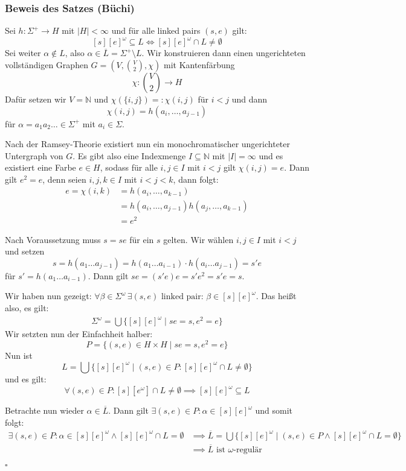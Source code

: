 \documentclass[12pt, german]{article}
\newcommand{\N}{\mathbb{N}}
\newcommand{\pom}{^{\omega}}
\newcommand{\splu}{\Sigma^{+}}
\newcommand{\bewiesen}{
	
	\begin{flushright}
		$\square$  \\
\end{flushright}}
\begin{document}
\subsubsection{Beweis des Satzes (Büchi)}
	Sei $h:\splu \to H$ mit $|H| < \infty$ und für alle linked pairs $(s,e)$ gilt: $$[s][e]\pom \subseteq L \iff [s][e]\pom \cap L \not = \emptyset$$
	Sei weiter $\alpha \not \in L$, also $\alpha \in \overline{L} = \splu \setminus L$. Wir konstruieren dann einen ungerichteten vollständigen Graphen $G = (V, \binom{V}{2}, \chi)$ mit Kantenfärbung $$\chi : \binom{V}{2} \to H$$ 
	Dafür setzen wir $V = \N$ und $\chi(\{i, j\}) =: \chi(i, j)$ für $i <j$ und dann $$\chi(i, j) = h(a_i, \ldots, a_{j-1})$$ für $\alpha = a_1a_2\ldots \in \Sigma^+$ mit $a_i \in \Sigma$.
	\newline
	
	Nach der  Ramsey-Theorie  existiert nun ein monochromatischer ungerichteter Untergraph von $G$. Es gibt also eine Indexmenge $I \subseteq \N$ mit $|I| = \infty$ und es existiert eine Farbe $e \in H$, sodass für alle $i,j \in I$ mit $i < j$ gilt $\chi(i, j) = e$. 
	Dann gilt $e^2 = e$, denn seien $i, j, k \in I$ mit $i < j < k$, dann folgt:
	\begin{align*}
		e = \chi(i, k) &= h(a_i, \ldots, a_{k-1}) \\
		&=h(a_i, \ldots, a_{j-1})h(a_j,\ldots,a_{k-1}) \\
		&=e^2
	\end{align*}
	
	Nach Voraussetzung muss $s = se$ für ein $s$ gelten. Wir wählen $i, j \in I$ mit $i < j$ und setzen $$s = h(a_1 \ldots a_{j-1}) = h(a_1 \ldots a_{i-1}) \cdot h(a_i \ldots a_{j-1}) = s'e$$ für 
	$s' = h(a_1\ldots a_{i-1})$. Dann gilt $se = (s'e)e = s'e^2 = s'e = s$. 
	
	Wir haben nun gezeigt: $\forall \beta \in \Sigma\pom \,\exists(s,e) \text{ linked pair: } \beta\in [s][e]\pom$. Das hei\ss t also, es gilt: 
	\begin{align*}
		\Sigma\pom = \bigcup \{[s][e]\pom \mid se = s, e^2 = e \}
	\end{align*}
	Wir setzten nun der Einfachheit halber: $$P = \{ (s,e) \in H \times H \mid se = s, e^2 = e\}$$
	Nun ist $$L = \bigcup\{[s][e]\pom \mid (s,e)\in P : [s][e]\pom \cap L \not = \emptyset\}$$ und es gilt: $$\forall (s,e) \in P: [s][e\pom] \cap L \not = \emptyset \implies [s][e]\pom \subseteq L$$
	\newline
	
	Betrachte nun wieder $\alpha \in \overline{L}$. Dann gilt $\exists (s,e) \in P : \alpha \in [s][e]\pom$ und somit folgt:
	\begin{align*}
		\exists (s,e) \in P: \alpha \in [s][e]\pom \land [s][e]\pom \cap L = \emptyset 
		&\implies \overline{ L } = \bigcup \{[s][e]\pom \mid (s,e )\in P \land [s][e]\pom \cap L = \emptyset\} \\
		&\implies \overline{ L } \text{ ist $\omega$-regulär}
	\end{align*}
	\bewiesen
\end{document}
